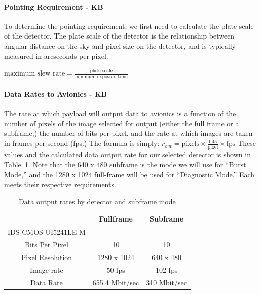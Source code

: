 \documentclass[12pt]{article}
\begin{document}
\paragraph{Pointing Requirement - KB}\label{sec:pointing_requirement}

To determine the pointing requirement, we first need to calculate the plate scale of the detector.
The plate scale of the detector is the relationship between angular distance on the sky and pixel size on the detector, and is typically measured in arcseconds per pixel.  

$\text{maximum slew rate} = \frac{\text{plate scale}}{\text{minimum exposure time}}$

\paragraph{Data Rates to Avionics - KB}

The rate at which payload will output data to avionics is a function of the number of pixels of the image selected for output (either the full frame or a subframe,) the number of bits per pixel, and the rate at which images are taken in frames per second (fps.) The formula is simply: $r_{out} = \text{pixels} \times \frac{\text{bits}}{\text{pixel}} \times \text{fps}$
These values and the calculated data output rate for our selected detector is shown in Table~\ref{table:payload-data-rates}. Note that the 640 x 480 subframe is the mode we will use for ``Burst Mode,'' and the 1280 x 1024 full-frame will be used for ``Diagnostic Mode.'' Each meets their respective requirements. 

\begin{table}
\begin{center}
\caption{Data output rates by detector and subframe mode}
\begin{tabular}{|c||c|c|} 
\hline
& Fullframe & Subframe \\
\hline
IDS CMOS UI5241LE-M  &  &   \\
\hline
Bits Per Pixel &  10 & 10\\
Pixel Resolution  & 1280 x 1024 & 640 x 480 \\
Image rate &  50 fps & 102 fps\\
Data Rate & 655.4 Mbit/sec & 310 Mbit/sec \\
\hline
\end{tabular}\label{table:payload-data-rates}
\end{center}
\end{table}
\end{document}
